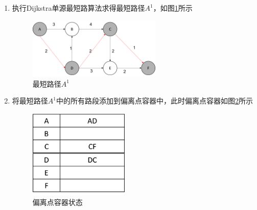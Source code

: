 \begin{enumerate}%
    \item 执行Dijkstra单源最短路算法求得最短路径$A^1$，如图\ref{fig:fig18}所示
    \begin{figure}[H] %
        \centering %
        \includegraphics[width=0.6\textwidth]{png/图片18 最短路径A1} %
        \caption{最短路径$A^1$} %
        \label{fig:fig18} %
    \end{figure}

    \item 将最短路径$A^1$中的所有路段添加到偏离点容器中，此时偏离点容器如图\ref{fig:fig19}所示
    \begin{figure}[H] %
        \centering %
        \includegraphics[width=0.45\textwidth]{png/图片18偏离点容器} %
        \caption{偏离点容器状态} %
        \label{fig:fig19} %
    \end{figure}


\end{enumerate}
